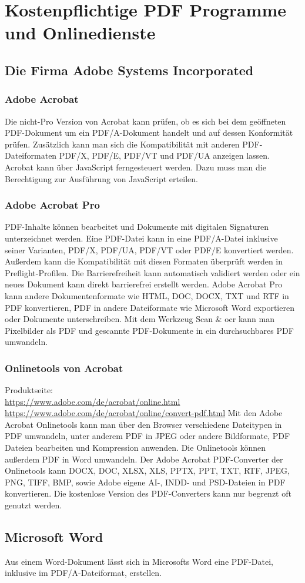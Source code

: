 \section{Kostenpflichtige PDF Programme und Onlinedienste}

\subsection{Die Firma Adobe Systems Incorporated}

\subsubsection{Adobe Acrobat}
Die nicht-Pro Version von Acrobat kann prüfen, ob es sich bei dem geöffneten PDF-Dokument um ein PDF/A-Dokument handelt und auf dessen Konformität prüfen. Zusätzlich kann man sich die Kompatibilität mit anderen PDF-Dateiformaten PDF/X, PDF/E, PDF/VT und PDF/UA anzeigen lassen. \cite{adobe-pdf-a} Acrobat kann über JavaScript ferngesteuert werden. Dazu muss man die Berechtigung zur Ausführung von JavaScript erteilen. \cite{schneeberger}

\subsubsection{Adobe Acrobat Pro}
PDF-Inhalte können bearbeitet und Dokumente mit digitalen Signaturen unterzeichnet werden. \cite{adobe-search}
Eine PDF-Datei kann in eine PDF/A-Datei inklusive seiner Varianten, PDF/X, PDF/UA, PDF/VT oder PDF/E konvertiert werden. Außerdem kann die Kompatibilität mit diesen Formaten überprüft werden in Preflight-Profilen. \cite{adobe-pdf-a} Die Barrierefreiheit kann automatisch validiert werden oder ein neues Dokument kann direkt barrierefrei erstellt werden.
Adobe Acrobat Pro kann andere Dokumentenformate wie HTML, DOC, DOCX, TXT und RTF in PDF konvertieren, PDF in andere Dateiformate wie Microsoft Word exportieren oder Dokumente unterschreiben. \cite{adobe-formate} 
Mit dem Werkzeug Scan \& \gls{ocr} kann man Pixelbilder als PDF und gescannte PDF-Dokumente in ein durchsuchbares PDF umwandeln. \cite{adobe-search}

\subsubsection{Onlinetools von Acrobat}
Produktseite: \\
\url{https://www.adobe.com/de/acrobat/online.html} \\
\url{https://www.adobe.com/de/acrobat/online/convert-pdf.html}
Mit den Adobe Acrobat Onlinetools kann man über den Browser verschiedene Dateitypen in PDF umwandeln, unter anderem PDF in JPEG oder andere Bildformate, PDF Dateien bearbeiten und Kompression anwenden. Die Onlinetools können außerdem PDF in Word umwandeln. \cite{adobe-search}
Der Adobe Acrobat PDF-Converter der Onlinetools kann DOCX, DOC, XLSX, XLS, PPTX, PPT, TXT, RTF, JPEG, PNG, TIFF, BMP, sowie Adobe eigene AI-, INDD- und PSD-Dateien in PDF konvertieren. \cite{adobe-formate} Die kostenlose Version des PDF-Converters kann nur begrenzt oft genutzt werden.

\subsection{Microsoft Word}
Aus einem Word-Dokument lässt sich in Microsofts Word eine PDF-Datei, inklusive im PDF/A-Dateiformat, erstellen. \cite{adobe-pdf-a}
